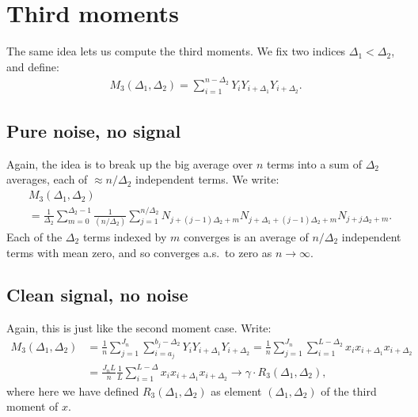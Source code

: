 \documentclass{article}
\theoremstyle{thm}
\theoremstyle{definition}
\newcommand{\1}{\mathbf{1}}
\begin{document}
%
%
%

\section{Third moments}

The same idea lets us compute the third moments. We fix two indices $\Delta_1 < \Delta_2$, and define:
%
\begin{align}
%
    M_3(\Delta_1,\Delta_2) = \sum_{i=1}^{n-\Delta_2} Y_i Y_{i+\Delta_1} Y_{i+\Delta_2}.
%
\end{align}


%
%
%

\subsection{Pure noise, no signal}

Again, the idea is to break up the big average over $n$ terms into a sum of $\Delta_2$ averages, each of $\approx n / \Delta_2$ independent terms. We write:
%
\begin{align}
%
    & M_3(\Delta_1,\Delta_2)  \nonumber \\
    & = \frac{1}{\Delta_2}\sum_{m=0}^{\Delta_2-1}
        \frac{1}{(n/\Delta_2)}\sum_{j=1}^{n/\Delta_2} 
            N_{j+(j-1)\Delta_2+m} N_{j+\Delta_1 + (j-1)\Delta_2 + m} N_{j+j\Delta_2 + m}.
%
\end{align}
%
Each of the $\Delta_2$ terms indexed by $m$ converges is an average of $n/\Delta_2$ independent terms with mean zero, and so converges a.s.\ to zero as $n \to \infty$.


%
%
%

\subsection{Clean signal, no noise}

Again, this is just like the second moment case. Write:
%
\begin{align}
%
    M_3(\Delta_1,\Delta_2) 
        &= \frac{1}{n} \sum_{j=1}^{J_n} \sum_{i=a_j}^{b_j-\Delta_2} 
            Y_i Y_{i+\Delta_1} Y_{i+\Delta_2}
        = \frac{1}{n} \sum_{j=1}^{J_n} \sum_{i=1}^{L-\Delta_2} 
            x_i x_{i+\Delta_1} x_{i+\Delta_2}
    \nonumber \\
    &= \frac{J_n L}{n} \frac{1}{L} \sum_{i=1}^{L-\Delta} x_i x_{i+\Delta_1} x_{i+\Delta_2}
        \to \gamma \cdot R_3(\Delta_1,\Delta_2),
%
\end{align}
%
where here we have defined $R_3(\Delta_1,\Delta_2)$ as element $(\Delta_1,\Delta_2)$ of the third moment of $x$.
\end{document}
